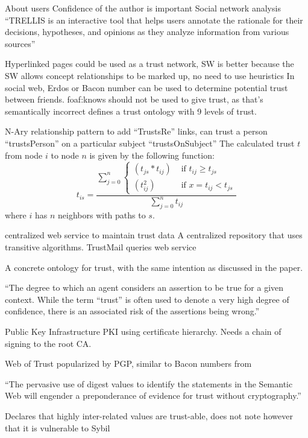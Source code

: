 \documentclass{acm_proc_article-sp}
\begin{document}
About users
Confidence of the author is important
Social network analysis
``TRELLIS is an interactive tool that helps users annotate the
rationale for their decisions, hypotheses, and opinions as they analyze information from various sources''\cite{gil_trusting_2002}

Hyperlinked pages could be used as a trust network, SW is better because the SW allows concept relationships to be marked up, no need to use heuristics
In social web, Erdos or Bacon number can be used to determine potential trust between friends.
foaf:knows should not be used to give trust, as that's semantically incorrect
defines a trust ontology with 9 levels of trust.

N-Ary relationship pattern to add ``TrustsRe'' links, can trust a person ``trustsPerson'' on a particular subject ``trustsOnSubject''
The calculated trust $t$ from node $i$ to node $n$ is given by the following function:
\begin{equation}
t_{is}=\frac{\sum_{j=0}^{n}{\begin{cases}
(t_{js}*t_{ij}) & \text{ if } t_{ij} \geq t_{js} \\ 
(t_{ij}^2) & \text{ if } x= t_{ij} < t_{js}
\end{cases}}}{\sum_{j=0}^{n}{t_{ij}}}
\end{equation}
where $i$ has $n$ neighbors with paths to $s$.

centralized web service to maintain trust data
A centralized repository that uses transitive algorithms.
TrustMail queries web service 
\cite{golbeck_trust_2003}

A concrete ontology for trust, with the same intention as discussed in the paper.
\cite{jennifer_golbeck_trust_2013}


``The degree to which an agent considers an assertion to be true for a given context. While the term ``trust'' is often used to denote a very high degree of confidence, there is an associated risk of the assertions being wrong.''

Public Key Infrastructure PKI using certificate hierarchy.
Needs a chain of signing to the root CA.

Web of Trust popularized by PGP, similar to Bacon numbers from \cite{golbeck_trust_2003}

``The pervasive use of digest values to identify the statements in the Semantic Web will engender a preponderance of evidence for trust without cryptography.''

Declares that highly inter-related values are trust-able, does not note however that it is vulnerable to Sybil\cite{douceur_sybil_2002}
\cite{reagle_key_2002}
\end{document}
